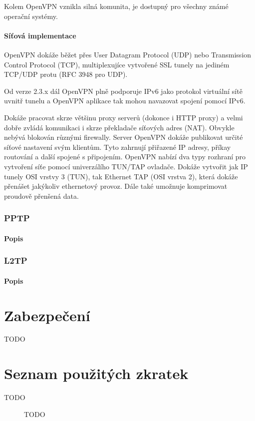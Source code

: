 \documentclass[thesis=B,czech]{FITthesis}[2012/06/26]
\begin{document}
        Kolem OpenVPN vznikla silná komunita, je dostupný pro všechny známé operační systémy.

      \subsubsection{Síťová implementace}

        OpenVPN dokáže běžet přes User Datagram Protocol (UDP) nebo Transmission Control Protocol (TCP), multiplexujíce vytvořené SSL tunely na jediném TCP/UDP protu\cite{openvpn_tls_mode_options} (RFC 3948 pro UDP).\cite{openvpn_udp}

        Od verze 2.3.x dál OpenVPN plně podporuje IPv6 jako protokol virtuální sítě uvnitř tunelu a OpenVPN aplikace tak mohou navazovat spojení pomocí IPv6.\cite{openvpn_community_wiki}

        Dokáže pracovat skrze většinu proxy serverů (dokonce i HTTP proxy) a velmi dobře zvládá komunikaci i skrze překladače síťových adres (NAT). Obvykle nebývá blokován různými firewally.
        Server OpenVPN dokáže publikovat určité síťové nastavení svým klientům. Tyto zahrnují přiřazené IP adresy, příkay routování a další spojené s připojením.
        OpenVPN nabízí dva typy rozhraní pro vytvoření síťe pomocí univerzálího TUN/TAP ovladače. Dokáže vytvořit jak IP tunely OSI vrstvy 3 (TUN), tak Ethernet TAP (OSI vrstva 2), která dokáže přenášet jakýkoliv ethernetový provoz. Dále také umožnuje komprimovat proudově přenšená data.

    \subsection{PPTP}

      \subsubsection{Popis}
        \cite{pptp_basics}

    \subsection{L2TP}

      \subsubsection{Popis}
        \cite{l2tp_basics}

\chapter{Zabezpečení}

\begin{conclusion}

    TODO

\end{conclusion}




\appendix

\chapter{Seznam použitých zkratek}
\begin{description}

    \item[TODO] TODO

\end{description}
\end{document}
